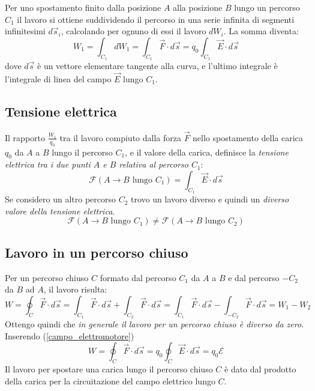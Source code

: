 \documentclass[class=book, crop=false, oneside, 12pt]{standalone}
\begin{document}
Per uno spostamento finito dalla posizione \(A\) alla posizione \(B\) lungo un percorso \(C_1\) il lavoro si ottiene suddividendo il percorso in una serie infinita di segmenti infinitesimi \(d \overrightarrow{s}_i\), calcolando per ognuno di essi il lavoro \(dW_i\).
La somma diventa:
\begin{equation} \label{lavoro_elettrostatico}
    W_1 = \int_{C_1} d W_1 = \int_{C_1} \overrightarrow{F} \cdot d \overrightarrow{s} = q_0 \int_{C_1} \overrightarrow{E} \cdot d \overrightarrow{s}
\end{equation}
dove \(d \overrightarrow{s}\) è un vettore elementare tangente alla curva, e l'ultimo integrale è l'integrale di linea del campo \(\overrightarrow{E}\) lungo \(C_1\).

\subsection{Tensione elettrica}

Il rapporto \(\frac{W_1}{q_0}\) tra il lavoro compiuto dalla forza \(\overrightarrow{F}\) nello spostamento della carica \(q_0\) da \(A\) a \(B\) lungo il percorso \(C_1\), e il valore della carica, definisce la \emph{tensione elettrica tra i due punti \(A\) e \(B\) relativa al percorso \(C_1\)}:
\begin{equation}
    \mathcal{F} \left(A \rightarrow B \text{ lungo } C_1\right) = \int_{C_1} \overrightarrow{E} \cdot d \overrightarrow{s}
\end{equation}
Se considero un altro percorso \(C_2\) trovo un lavoro diverso e quindi un \emph{diverso valore della tensione elettrica}.
\begin{equation*}
    \mathcal{F} \left(A \rightarrow B \text{ lungo } C_1\right) \neq \mathcal{F} \left(A \rightarrow B \text{ lungo } C_2\right)
\end{equation*}

\subsection{Lavoro in un percorso chiuso}

Per un percorso chiuso \(C\) formato dal percorso \(C_1\) da \(A\) a \(B\) e dal percorso \(-C_2\) da \(B\) ad \(A\), il lavoro risulta:
\begin{equation*}
    W = \oint_{C} \overrightarrow{F} \cdot d \overrightarrow{s} = \int_{C_1} \overrightarrow{F} \cdot d \overrightarrow{s} + \int_{C_2} \overrightarrow{F} \cdot d \overrightarrow{s} = \int_{C_1} \overrightarrow{F} \cdot d \overrightarrow{s} - \int_{-C_2} \overrightarrow{F} \cdot d \overrightarrow{s} = W_1 - W_2
\end{equation*}
Ottengo quindi che \emph{in generale il lavoro per un percorso chiuso è diverso da zero}. Inserendo (\ref{campo_elettromotore})
\begin{equation}
    W = \oint_{C} \overrightarrow{F} \cdot d \overrightarrow{s} = q_0 \oint_{C} \overrightarrow{E} \cdot d \overrightarrow{s} = q_0 \mathcal{E}
\end{equation}
Il lavoro per spostare una carica lungo il percorso chiuso \(C\) è dato dal prodotto della carica per la circuitazione del campo elettrico lungo \(C\).
\end{document}
